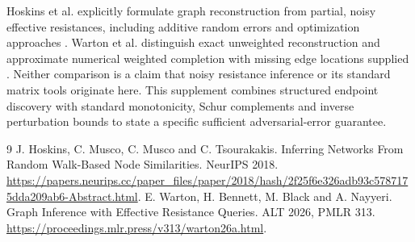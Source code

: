 \documentclass[11pt,letterpaper]{article}
\begin{document}
Hoskins et al. explicitly formulate graph reconstruction from partial, noisy effective resistances, including additive random errors and optimization approaches \cite{hoskins}. Warton et al. distinguish exact unweighted reconstruction and approximate numerical weighted completion with missing edge locations supplied \cite{warton}. Neither comparison is a claim that noisy resistance inference or its standard matrix tools originate here. This supplement combines structured endpoint discovery with standard monotonicity, Schur complements and inverse perturbation bounds to state a specific sufficient adversarial-error guarantee.

\begin{thebibliography}{9}
 J. Hoskins, C. Musco, C. Musco and C. Tsourakakis. Inferring Networks From Random Walk-Based Node Similarities. NeurIPS 2018. \url{https://papers.neurips.cc/paper_files/paper/2018/hash/2f25f6e326adb93c5787175dda209ab6-Abstract.html}.
 E. Warton, H. Bennett, M. Black and A. Nayyeri. Graph Inference with Effective Resistance Queries. ALT 2026, PMLR 313. \url{https://proceedings.mlr.press/v313/warton26a.html}.
\end{thebibliography}
\end{document}

